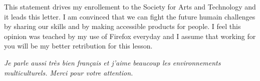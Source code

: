 This statement drives my enrollement to the Society for Arts and Technology and it leads this letter. I am convinced that we can fight the future humain challenges by sharing our skills and by making accessible products for people. I feel this opinion was teached by my use of Firefox everyday and I assume that working for you will be my better retribution for this lesson.

\textit{Je parle aussi très bien français et j'aime beaucoup les environnements multiculturels. Merci pour votre attention.}

\makeletterclosing
